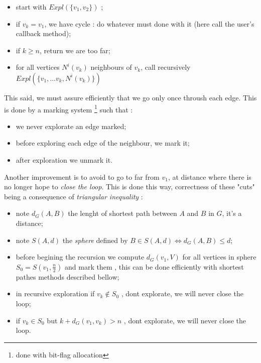 \begin{itemize}
    \item  start with $Expl(\{v_1,v_2\})$  ;
    \item  if $v_k=v_1$, we have cycle : do whatever must done with it (here call the user's callback method);
    \item  if $k\geq n$, return we are too far;
    \item  for all vertices $N^i(v_k)$ neighbours of $v_k$, call recursively  $Expl(\{v_1, \dots v_k,  N^i(v_k)\})$
\end{itemize}

This said, we must assure efficiently that we go only once throush each edge.  This is done by a marking
system \footnote{done with bit-flag allocation} such that :

\begin{itemize}
    \item we never explorate an edge marked;
    \item before exploring each edge of the neighbour, we mark it;
    \item after exploration we unmark it.
\end{itemize}

Another improvement is to avoid to go to far from $v_1$, at distance where there is no longer
hope to \emph{close the loop}. This is done this way, correctness of these "cuts" being
a consequence of \emph{triangular inequality} :

\begin{itemize}
   \item   note $d_G(A,B)$ the lenght of shortest path between $A$ and $B$ in $G$, it's a distance;

   \item  note $S(A,d)$ the \emph{sphere} defined by $ B \in S(A,d) \Leftrightarrow d_G(A,B) \leq d$;

   \item  before begining the recursion we compute $d_G(v_1,V)$ for all vertices in sphere $S_0 = S(v_1,\frac{n}{2})$ and mark them ,
           this can be done efficiently with shortest pathes methods described bellow;

   \item  in recursive exploration if $v_k \notin  S_0$ , dont explorate, we will never close the loop;

   \item  if $v_k \in  S_0$  but $k + d_G(v_1,v_k) > n$ , dont explorate, we will never close the loop.
\end{itemize}

